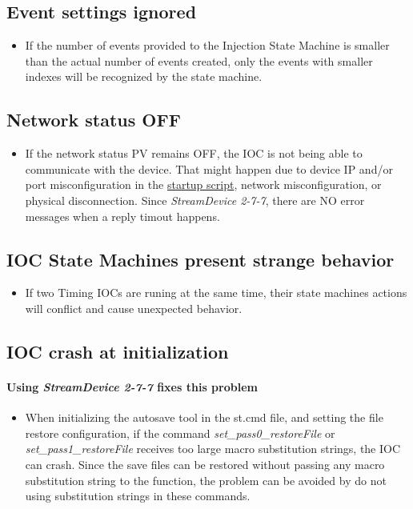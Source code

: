 \documentclass[openany]{article}
\begin{document}
	\subsection{Event settings ignored}
		\begin{itemize}
		\item If the number of events provided to the Injection State Machine is smaller than the actual number of events created, only the events with smaller indexes will be recognized by the state machine.
		\end{itemize}

	\subsection{Network status OFF}

		\begin{itemize}
		\item If the network status PV remains OFF, the IOC is not being able to communicate with the device. That might happen due to device IP and/or port misconfiguration in the \hyperref[sec:startup-script]{startup script}, network misconfiguration, or physical disconnection. Since \emph{StreamDevice 2-7-7}, there are NO error messages when a reply timout happens.
		\end{itemize}

	\subsection{IOC State Machines present strange behavior}

		\begin{itemize}
		\item If two Timing IOCs are runing at the same time, their state machines actions will conflict and cause unexpected behavior.
		\end{itemize}

	\subsection{IOC crash at initialization}

		\paragraph{\color{red} Using \emph{StreamDevice 2-7-7} fixes this problem}

		\begin{itemize}
		\item When initializing the autosave tool in the st.cmd file, and setting the file restore configuration, if the command \emph{set\_pass0\_restoreFile} or \emph{set\_pass1\_restoreFile} receives too large macro substitution strings, the IOC can crash. Since the save files can be restored without passing any macro substitution string to the function, the problem can be avoided by do not using substitution strings in these commands. 
		\end{itemize}
\end{document}
